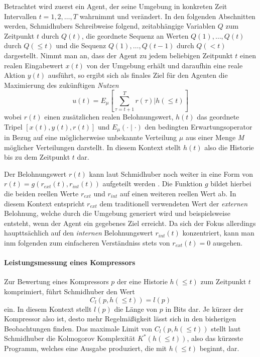 Betrachtet wird zuerst ein Agent, der seine Umgebung in konkreten Zeit Intervallen \(t = 1,2, \dots ,T\) wahrnimmt und verändert. 
In den folgenden Abschnitten werden, Schmidhubers Schreibweise folgend, zeitabhängige Variablen \(Q\) zum Zeitpunkt \(t\) durch \(Q(t)\), die geordnete Sequenz an Werten \(Q(1), \dots,Q(t)\) durch \(Q(\leq t)\) und die Sequenz \(Q(1), \dots, Q(t-1)\) durch \(Q(<t)\) dargestellt.
Nimmt man an, dass der Agent zu jedem beliebigen Zeitpunkt \(t\) einen realen Eingabewert \(x(t)\) von der Umgebung erhält und daraufhin eine reale Aktion \(y(t)\) ausführt, so ergibt sich als finales Ziel für den Agenten die Maximierung des zukünftigen \emph{Nutzen} 
\begin{equation} \label{eq:objective_curiosity}
  u(t) = E_\mu \left[ \sum^T_{\tau=t+1} r(\tau) \bigl\lvert h(\leq t)\right]  
\end{equation}
wobei \(r(t)\) einen zusätzlichen realen Belohnungswert, \(h(t)\) das geordnete Tripel \(\left[ x(t),y(t),r(t)\right]\) und \(E_\mu(\cdot \mid \cdot)\) den bedingten Erwartungsoperator in Bezug auf eine möglicherweise unbekannte Verteilung \(\mu\) aus einer Menge \emph{M} möglicher Verteilungen darstellt. \cite[p.~17]{curiosity_schmidhuber}
In diesem Kontext stellt \(h(t)\) also die Historie bis zu dem Zeitpunkt \(t\) dar.

Der Belohnungswert \(r(t)\) kann laut Schmidhuber noch weiter in eine Form von \(r(t) = g(r_{ext}(t),r_{int}(t))\) aufgeteilt werden \cite{curiosity_schmidhuber}.
Die Funktion \(g\) bildet hierbei die beiden reellen Werte \(r_{ext}\) und \(r_{int}\) auf einen weiteren reellen Wert ab. In diesem Kontext entspricht \(r_{ext}\) dem traditionell verwendeten Wert der \emph{externen} Belohnung, welche durch die Umgebung generiert wird und beispielsweise entsteht, wenn der Agent ein gegebenes Ziel erreicht. 
Da sich der Fokus allerdings haupttsächlich auf den \emph{internen} Belohnungswert \(r_{int}(t)\) konzentriert, kann man inm folgenden zum einfacheren Verständniss stets von \(r_{ext}(t) = 0\) ausgehen.

\paragraph{Leistungsmessung eines Kompressors}
\label{sec:Kompressor_Leistung}
Zur Bewertung eines Kompressors \(p\) der eine Historie \(h(\leq t)\) zum Zeitpunkt \(t\) komprimiert, führt Schmidhuber den Wert 
\begin{equation}
  C_l(p,h(\leq t)) = l(p)  
\end{equation}
ein. In diesem Kontext stellt \(l(p)\) die Länge von \(p\) in Bits dar. Je kürzer der Kompressor also ist, desto mehr Regelmäßigkeit lässt sich in den bisherigen Beobachtungen finden. \cite[p.~19]{curiosity_schmidhuber}
Das maximale Limit von \(C_l(p,h(\leq t))\) stellt laut Schmidhuber die Kolmogorov Komplexität \(K^*(h(\leq t))\), also das kürzeste Programm, welches eine Ausgabe produziert, die mit \(h(\leq t)\) beginnt, dar.


